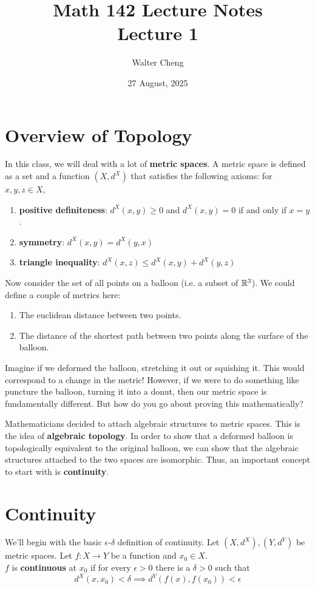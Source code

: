 \documentclass[11pt]{article}
\title{Math 142 Lecture Notes\\ Lecture 1}
\date{27 August, 2025}
\author{Walter Cheng}
\begin{document}
\maketitle

\section{Overview of Topology}
In this class, we will deal with a lot of \textbf{metric spaces}. A metric space is defined as a set and a function $(X, d^{X})$ that satisfies the following axioms: for $x, y, z \in X$,
\begin{enumerate}
	\item \textbf{positive definiteness}: $d^{X}(x, y) \geq 0$ and $d^{X}(x,y) = 0$ if and only if $x=y$.
	\item \textbf{symmetry}: $d^{X}(x,y) = d^{X}(y, x)$
	\item \textbf{triangle inequality}: $d^X(x, z) \leq d^X(x, y) + d^X(y, z)$
\end{enumerate}

Now consider the set of all points on a balloon (i.e. a subset of $\mathbb{R}^3$). We could define a couple of metrics here:
\begin{enumerate}
	\item The euclidean distance between two points.
	\item The distance of the shortest path between two points along the surface of the balloon.
\end{enumerate}

Imagine if we deformed the balloon, stretching it out or squishing it. This would correspond to a change in the metric! However, if we were to do something like puncture the balloon, turning it into a donut, then our metric space is fundamentally different. But how do you go about proving this mathematically?

Mathematicians decided to attach algebraic structures to metric spaces. This is the idea of \textbf{algebraic topology}. In order to show that a deformed balloon is topologically equivalent to the original balloon, we can show that the algebraic structures attached to the two spaces are isomorphic. Thus, an important concept to start with is \textbf{continuity}.

\section{Continuity}
We'll begin with the basic $\epsilon$-$\delta$ definition of continuity. Let $(X, d^X), (Y, d^Y)$ be metric spaces. Let $f\colon X \to Y$ be a function and $x_0 \in X$.\\
 $f$ is \textbf{continuous} at $x_0$ if for every $\epsilon > 0$ there is a $\delta > 0$ such that
\[d^X(x, x_0) < \delta \implies d^Y(f(x), f(x_0)) < \epsilon\]
\end{document}
